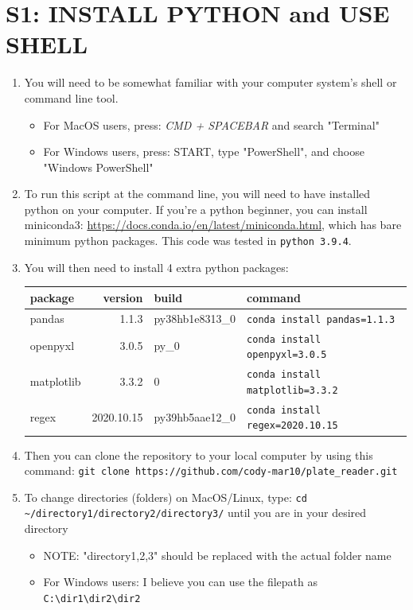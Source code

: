 \documentclass[12pt]{article}
\begin{document}
\section*{S1: INSTALL PYTHON and USE SHELL}
\label{sec:orgd5e7ac6}
\begin{enumerate}
\item You will need to be somewhat familiar with your computer system's shell or command line tool.
\begin{itemize}
\item For MacOS users, press: \emph{CMD + SPACEBAR} and search "Terminal"
\item For Windows users, press: START, type "PowerShell", and choose "Windows PowerShell"
\end{itemize}

\item To run this script at the command line, you will need to have installed python on your computer. If you're a python beginner, you can install miniconda3: \url{https://docs.conda.io/en/latest/miniconda.html}, which has bare minimum python packages. This code was tested in \texttt{python 3.9.4}.

\item You will then need to install 4 extra python packages:
\begin{center}
\begin{tabular}{lrll}
package & version & build & command\\
\hline
pandas & 1.1.3 & py38hb1e8313\_0 & \texttt{conda install pandas=1.1.3}\\
openpyxl & 3.0.5 & py\_0 & \texttt{conda install openpyxl=3.0.5}\\
matplotlib & 3.3.2 & 0 & \texttt{conda install matplotlib=3.3.2}\\
regex & 2020.10.15 & py39hb5aae12\_0 & \texttt{conda install regex=2020.10.15}\\
\end{tabular}
\end{center}

\item Then you can clone the repository to your local computer by using this command: \texttt{git clone https://github.com/cody-mar10/plate\_reader.git}

\item To change directories (folders) on MacOS/Linux, type: \texttt{cd \textasciitilde{}/directory1/directory2/directory3/} until you are in your desired directory
\begin{itemize}
\item NOTE: "directory1,2,3" should be replaced with the actual folder name
\item For Windows users: I believe you can use the filepath as \texttt{C:\textbackslash{}dir1\textbackslash{}dir2\textbackslash{}dir2}
\end{itemize}


\end{enumerate}
\end{document}
